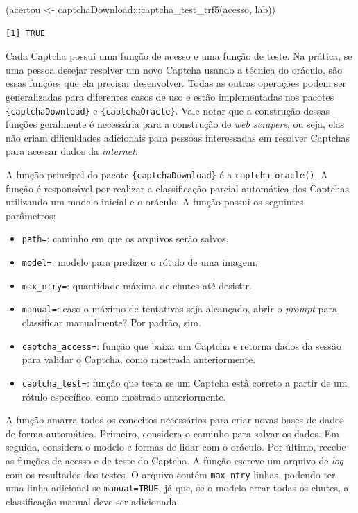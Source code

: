 \documentclass[12pt,twoside,brazilian]{book}
\newenvironment{Shaded}{\begin{snugshade}}{\end{snugshade}}
\newcommand{\FunctionTok}[1]{\textcolor[rgb]{0.28,0.35,0.67}{#1}}
\newcommand{\NormalTok}[1]{\textcolor[rgb]{0.00,0.23,0.31}{#1}}
\newcommand{\OtherTok}[1]{\textcolor[rgb]{0.00,0.23,0.31}{#1}}
\newcommand{\SpecialCharTok}[1]{\textcolor[rgb]{0.37,0.37,0.37}{#1}}
\providecommand{\tightlist}{%
  \setlength{\itemsep}{0pt}\setlength{\parskip}{0pt}}
\begin{document}
\begin{Shaded}
\begin{Highlighting}[]
\NormalTok{(acertou }\OtherTok{\textless{}{-}}\NormalTok{ captchaDownload}\SpecialCharTok{:::}\FunctionTok{captcha\_test\_trf5}\NormalTok{(acesso, lab))}
\end{Highlighting}
\end{Shaded}

\begin{verbatim}
[1] TRUE
\end{verbatim}

Cada Captcha possui uma função de acesso e uma função de teste. Na
prática, se uma pessoa desejar resolver um novo Captcha usando a técnica
do oráculo, são essas funções que ela precisar desenvolver. Todas as
outras operações podem ser generalizadas para diferentes casos de uso e
estão implementadas nos pacotes \texttt{\{captchaDownload\}} e
\texttt{\{captchaOracle\}}. Vale notar que a construção dessas funções
geralmente é necessária para a construção de \emph{web scrapers}, ou
seja, elas não criam dificuldades adicionais para pessoas interessadas
em resolver Captchas para acessar dados da \emph{internet}.

A função principal do pacote \texttt{\{captchaDownload\}} é a
\texttt{captcha\_oracle()}. A função é responsável por realizar a
classificação parcial automática dos Captchas utilizando um modelo
inicial e o oráculo. A função possui os seguintes parâmetros:

\begin{itemize}
\tightlist
\item
  \texttt{path=}: caminho em que os arquivos serão salvos.
\item
  \texttt{model=}: modelo para predizer o rótulo de uma imagem.
\item
  \texttt{max\_ntry=}: quantidade máxima de chutes até desistir.
\item
  \texttt{manual=}: caso o máximo de tentativas seja alcançado, abrir o
  \emph{prompt} para classificar manualmente? Por padrão, sim.
\item
  \texttt{captcha\_access=}: função que baixa um Captcha e retorna dados
  da sessão para validar o Captcha, como mostrada anteriormente.
\item
  \texttt{captcha\_test=}: função que testa se um Captcha está correto a
  partir de um rótulo específico, como mostrado anteriormente.
\end{itemize}

A função amarra todos os conceitos necessários para criar novas bases de
dados de forma automática. Primeiro, considera o caminho para salvar os
dados. Em seguida, considera o modelo e formas de lidar com o oráculo.
Por último, recebe as funções de acesso e de teste do Captcha. A função
escreve um arquivo de \emph{log} com os resultados dos testes. O arquivo
contém \texttt{max\_ntry} linhas, podendo ter uma linha adicional se
\texttt{manual=TRUE}, já que, se o modelo errar todas os chutes, a
classificação manual deve ser adicionada.
\end{document}
